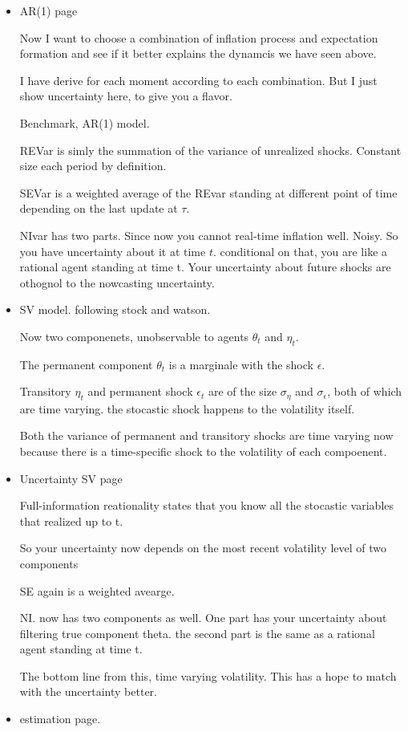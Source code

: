 \documentclass[]{article}
\begin{document}
\begin{itemize}
\item AR(1) page

Now I want to choose a combination of inflation process and expectation formation and see if it better explains the dynamcis we have seen above. 

I have derive for each moment according to each combination. But I just show uncertainty here, to give you a flavor. 

Benchmark, AR(1) model. 

REVar is simly the summation of the variance of unrealized shocks.  Constant size each period by definition. 

SEVar is a weighted average of the REvar standing at different point of time depending on the last update at $\tau$. 

NIvar has two parts. Since now you cannot real-time inflation well. Noisy. So you have uncertainty about it at time $t$. conditional on that, you are like a rational agent standing at time t. Your uncertainty about future shocks are othognol to the nowcasting uncertainty. 

\item SV model. following stock and watson. 

Now two componenets, unobservable to agents $\theta_t$ and $\eta_t$. 

The permanent component $\theta_t$ is a marginale with the shock $\epsilon$. 

Transitory $\eta_t$ and permanent shock $\epsilon_t$ are of the size $\sigma_\eta$ and $\sigma_\epsilon$, both of which are time varying. the stocastic shock happens to the volatility itself. 
 
Both the variance of permanent and transitory shocks are time varying now because there is a time-specific shock to the volatility of each compoenent.
 
\item Uncertainty SV page

Full-information reationality states that you know all the stocastic variables that realized up to t. 

So your uncertainty now depends on the most recent volatility level of two components

SE again is a weighted avearge. 

NI. now has two components as well. One part has your uncertainty about filtering true component theta. the second part is the same as a rational agent standing at time t. 

The bottom line from this, time varying volatility. This has a hope to match with the uncertainty better. 
 
 \item estimation page. 
 

 
 \end{itemize}
 
\end{document}

